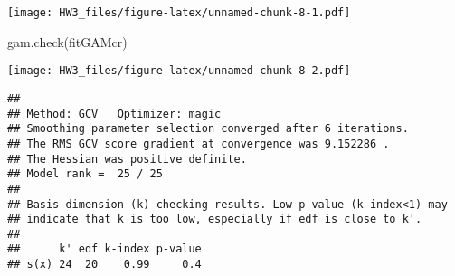 \documentclass[
]{article}
\newenvironment{Shaded}{\begin{snugshade}}{\end{snugshade}}
\newcommand{\AttributeTok}[1]{\textcolor[rgb]{0.77,0.63,0.00}{#1}}
\newcommand{\DecValTok}[1]{\textcolor[rgb]{0.00,0.00,0.81}{#1}}
\newcommand{\FunctionTok}[1]{\textcolor[rgb]{0.00,0.00,0.00}{#1}}
\newcommand{\NormalTok}[1]{#1}
\newcommand{\OtherTok}[1]{\textcolor[rgb]{0.56,0.35,0.01}{#1}}
\newcommand{\SpecialCharTok}[1]{\textcolor[rgb]{0.00,0.00,0.00}{#1}}
\newcommand{\StringTok}[1]{\textcolor[rgb]{0.31,0.60,0.02}{#1}}
\begin{document}
\begin{Shaded}
\end{Shaded}

\texttt{[image: HW3\_files/figure-latex/unnamed-chunk-8-1.pdf]}

\begin{Shaded}
\begin{Highlighting}[]
\FunctionTok{gam.check}\NormalTok{(fitGAMcr)}
\end{Highlighting}
\end{Shaded}

\texttt{[image: HW3\_files/figure-latex/unnamed-chunk-8-2.pdf]}

\begin{verbatim}
## 
## Method: GCV   Optimizer: magic
## Smoothing parameter selection converged after 6 iterations.
## The RMS GCV score gradient at convergence was 9.152286 .
## The Hessian was positive definite.
## Model rank =  25 / 25 
## 
## Basis dimension (k) checking results. Low p-value (k-index<1) may
## indicate that k is too low, especially if edf is close to k'.
## 
##      k' edf k-index p-value
## s(x) 24  20    0.99     0.4
\end{verbatim}
\end{document}
